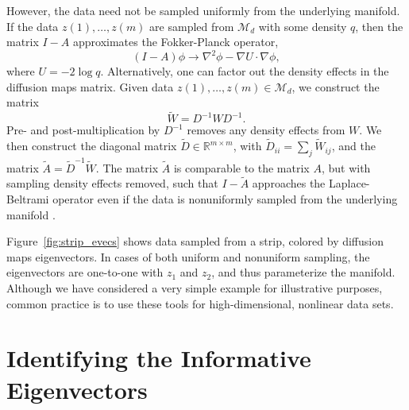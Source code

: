 \documentclass[preprint]{elsarticle}
\begin{document}
However, the data need not be sampled uniformly from the underlying manifold.
%
If the data $z(1), \dots, z(m)$ are sampled from $\mathcal{M}_d$ with some density $q$, then the matrix $I-A$ approximates the Fokker-Planck operator, 
\begin{equation}
(I-A) \phi \rightarrow \nabla^2 \phi - \nabla U \cdot \nabla \phi, 
\end{equation}
where $U = -2 \log q$. 
%
Alternatively, one can factor out the density effects in the diffusion maps matrix.
%
Given data $z(1), \dots, z(m) \in \mathcal{M}_d$, we construct the matrix
%
\begin{equation}
\tilde{W} = D^{-1} W D^{-1}.
\end{equation}
%
Pre- and post-multiplication by $D^{-1}$ removes any density effects from $W$. 
%
We then construct the diagonal matrix $\tilde{D} \in \mathbb{R}^{m \times m}$, with $\tilde{D}_{ii} = \sum_j \tilde{W}_{ij}$, and the matrix $\tilde{A}  = \tilde{D}^{-1} \tilde{W}.$
%
The matrix $\tilde{A}$ is comparable to the matrix $A$, but with sampling density effects removed, such that $I-\tilde{A}$ approaches the Laplace-Beltrami operator even if the data is nonuniformly sampled from the underlying manifold \cite{coifman2005geometric}. 

Figure~\ref{fig:strip_evecs} shows data sampled from a strip, colored by diffusion maps eigenvectors. 
%
In cases of both uniform and nonuniform sampling, the eigenvectors are one-to-one with $z_1$ and $z_2$, and thus parameterize the manifold. 
%
Although we have considered a very simple example for illustrative purposes, common practice is to use these tools for high-dimensional, nonlinear data sets.




\section{Identifying the Informative Eigenvectors }
\end{document}
